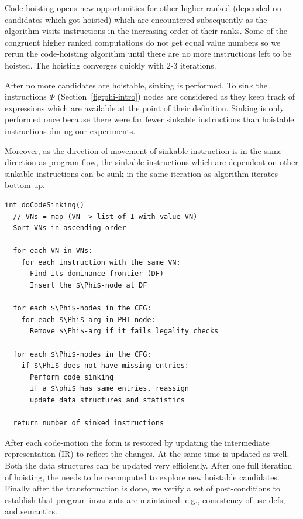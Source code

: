 \documentclass[sigplan,10pt,review,anonymous]{acmart}\settopmatter{printfolios=true,printccs=false,printacmref=false}
\begin{document}
Code hoisting opens new opportunities for other higher ranked
\cite{rosen1988global} (depended on candidates which got hoisted) which are
encountered subsequently as the algorithm visits instructions in the increasing
order of their ranks. Some of the congruent higher ranked computations do not
get equal value numbers so we rerun the code-hoisting algorithm until there are
no more instructions left to be hoisted. The hoisting converges quickly with 2-3
iterations.

After no more candidates are hoistable, sinking is performed. To sink the
instructions $\Phi$ (Section~\ref{fig:phi-intro}) nodes are considered as they
keep track of expressions which are available at the point of their definition.
Sinking is only performed once because there were far fewer sinkable
instructions than hoistable instructions during our experiments.

Moreover, as the direction of movement of sinkable instruction is in the same
direction as program flow, the sinkable instructions which are dependent on
other sinkable instructions can be sunk in the same iteration as algorithm
iterates bottom up.


\begin{lstlisting}[caption={Sink instructions},captionpos=b,label={algo:sink}]
int doCodeSinking()
  // VNs = map (VN -> list of I with value VN)
  Sort VNs in ascending order

  for each VN in VNs:
    for each instruction with the same VN:
      Find its dominance-frontier (DF)
      Insert the $\Phi$-node at DF

  for each $\Phi$-nodes in the CFG:
    for each $\Phi$-arg in PHI-node:
      Remove $\Phi$-arg if it fails legality checks

  for each $\Phi$-nodes in the CFG:
    if $\Phi$ does not have missing entries:
      Perform code sinking
      if a $\phi$ has same entries, reassign
      update data structures and statistics

  return number of sinked instructions
\end{lstlisting}

After each code-motion the \SSA{} form is restored by updating the
intermediate representation (IR) to reflect the changes. At the same time
\MemorySSA{} is updated as well. Both the data structures can be updated very
efficiently. After one full iteration of hoisting, the \GVN{} needs to be
recomputed to explore new hoistable candidates.  Finally after the
transformation is done, we verify a set of post-conditions to establish that
program invariants are maintained: e.g., consistency of use-defs, and \SSA{}
semantics.
\end{document}
